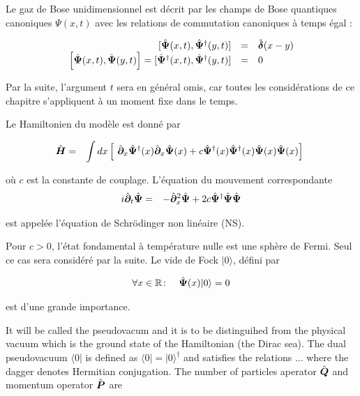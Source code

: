 Le gaz de Bose unidimensionnel est décrit par les champs de Bose quantiques canoniques \( \Psi(x, t) \) avec les relations de commutation canoniques à temps égal :


\begin{eqnarray}
	\left . \begin{array}{rcl}
		[ \hat{\bm{\Psi}}(x, t),  \hat{\bm{\Psi}}^\dagger(y, t) ]  &=&  \hat{\bm{\delta}}(x - y) \\
		\left [ \hat{\bm{\Psi}}(x, t),  \hat{\bm{\Psi}}(y, t) \right ]   =  [ \hat{\bm{\Psi}}^\dag(x, t),  \hat{\bm{\Psi}}^\dag(y, t) ]  &=&  0 
	\end{array} \right . \label{eq.1.1}
\end{eqnarray}

Par la suite, l'argument \( t \) sera en général omis, car toutes les considérations de ce chapitre s'appliquent à un moment fixe dans le temps.

Le Hamiltonien du modèle est donné par

\begin{eqnarray}
	\operator{H} & = & \int dx \left [ \operator{\partial}_x \operator{\Psi}^\dag (x) \operator{\partial}_x \operator{\Psi}(x) + c \operator{\Psi}^\dag (x) \operator{\Psi}^\dag (x) \operator{\Psi} (x) \operator{\Psi} (x) \right ] 
\end{eqnarray}


où \( c \) est la constante de couplage. L'équation du mouvement correspondante
\begin{eqnarray}
	i \hat{\bm{\partial}}_t \hat{\bm{\Psi}}	 & = & - \hat{\bm{\partial}}_x^2 \hat{\bm{\Psi}} + 2 c \hat{\bm{\Psi}}^\dag\hat{\bm{\Psi}} \hat{\bm{\Psi}}
\end{eqnarray}

est appelée l'équation de Schrödinger non linéaire (NS).

Pour $c > 0$, l'état fondamental à température nulle est une sphère de Fermi. Seul ce cas sera considéré par la suite. Le vide de Fock $\vert 0 \rangle$, défini par 


\begin{eqnarray}
	\forall x \in \mathbb{R} & \colon & \hat{\bm{\Psi}} (x) \vert 0 \rangle = 	0 \label{eq.1.4}
\end{eqnarray}

est d'une grande importance.

It will be called the pseudovacum and it is to be distinguihed from the physical vacuum which is the ground state of the Hamiltonian (the Dirac sea). The dual pseudovacuum $\langle 0 \vert$ is defined as $\langle 0 \vert =  \vert 0 \rangle^\dag$ and satisfies the relations ... where the dagger denotes Hermitian conjugation. The number of particles aperator $\hat{\bm{Q}}$ and momentum operator $\hat{\bm{P}}$ are 


